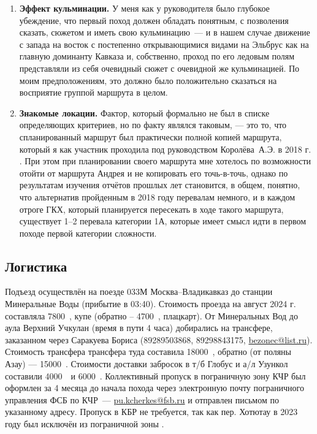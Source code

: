 \begin{enumerate}
	\item \textbf{Эффект кульминации.}
	У меня как у руководителя было глубокое убеждение, что первый поход должен обладать понятным, с позволения сказать, сюжетом и иметь свою кульминацию~--- и в нашем случае движение с запада на восток с постепенно открывающимися видами на Эльбрус как на главную доминанту Кавказа и, собственно, проход по его ледовым полям представляли из себя очевидный сюжет с очевидной же кульминацией. По моим предположениям, это должно было положительно сказаться на восприятие группой  маршрута в целом. 
	
	\item\textbf{ Знакомые локации.}
	Фактор, который формально не был в списке определяющих критериев, но по факту являлся таковым, — это то, что спланированный маршрут был практически полной копией маршрута, который я как участник проходила под руководством Королёва~А.Э. в 2018 г. \cite{Korolyov2018}. При этом при планировании своего маршрута мне хотелось по возможности отойти от маршрута Андрея и не копировать его точь-в-точь, однако по результатам изучения отчётов прошлых лет становится, в общем, понятно, что альтернатив пройденным в 2018 году перевалам немного, и в каждом отроге ГКХ, который планируется пересекать в ходе такого маршрута, существует 1–2 перевала категории 1А, которые имеет смысл идти в первом походе первой категории сложности.
\end{enumerate} 
\subsection{Логистика}
Подъезд осуществлён на поезде 033М Москва--Владикавказ до станции Минеральные Воды (прибытие в 03:40). Стоимость проезда на август 2024 г. составляла 7800~\faRub, купе (обратно – 4700~\faRub, плацкарт). От Минеральных Вод до аула Верхний Учкулан (время в пути 4 часа) добирались на трансфере, заказанном через Саракуева Бориса (89289503868, 89298843175,  \href{mailto: bezonec@list.ru}{bezonec@list.ru}). Стоимость трансфера трансфера туда составила 18000~\faRub, обратно (от поляны Азау) — 15000~\faRub. Стоимости доставки забросок в т/б Глобус и а/л Узункол составили 4000~\faRub~и 6000~\faRub.
Коллективный пропуск в пограничную зону КЧР был оформлен за 4 месяца до начала похода через электронную почту пограничного управления ФСБ по КЧР~--- \href{mailto: pu.kcherkes@fsb.ru}{pu.kcherkes@fsb.ru} и отправлен письмом по указанному адресу. Пропуск в КБР не требуется, так как пер. Хотютау в 2023 году был исключён из пограничной зоны \cite{order_kbr}.
